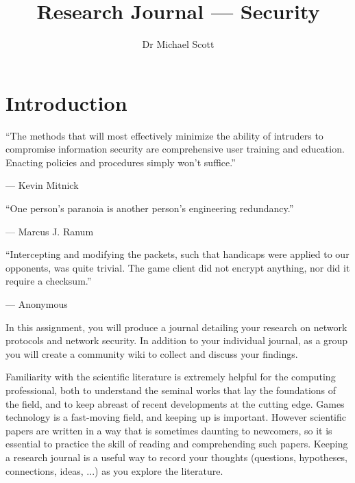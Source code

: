\documentclass{../fal_assignment}
\title{Research Journal --- Security}
\author{Dr Michael Scott}
\begin{document}
\maketitle

\section*{Introduction}

\begin{marginquote}
  ``The methods that will most effectively minimize the ability of intruders to compromise information security are comprehensive user training and education. Enacting policies and procedures simply won't suffice.''
    
    --- Kevin Mitnick
    
    \marginquoterule
    
    ``One person's paranoia is another person's engineering redundancy.''
    
    --- Marcus J. Ranum
    
    \marginquoterule

        ``Intercepting and modifying the packets, such that handicaps were applied to our opponents, was quite trivial. The game client did not encrypt anything, nor did it require a checksum.''
    
    --- Anonymous
            
\end{marginquote}

In this assignment, you will produce a journal detailing your research on network protocols and network security. In addition to your individual journal, as a group you will create a community wiki to collect and discuss your findings.

Familiarity with the scientific literature is extremely helpful for the computing professional,
both to understand the seminal works that lay the foundations of the field,
and to keep abreast of recent developments at the cutting edge.
Games technology is a fast-moving field, and keeping up is important.
However scientific papers are written in a way that is sometimes daunting to newcomers,
so it is essential to practice the skill of reading and comprehending such papers.
Keeping a research journal is a useful way to record your thoughts
(questions, hypotheses, connections, ideas, ...) as you explore the literature.
\end{document}
